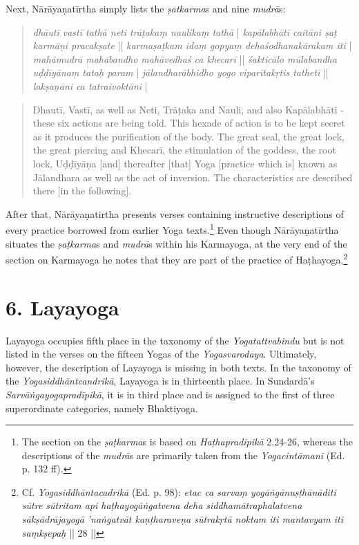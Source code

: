 Next, Nārāyaṇatīrtha simply lists the \textit{ṣatkarma}s and nine \textit{mudrā}s: 
\begin{quote}
\textit{dhāutī vastī tathā neti trāṭakaṃ naulikaṃ tathā} |
\textit{kapālabhātī caitāni ṣaṭ karmāṇi pracakṣate} ||
\textit{karmaṣaṭkam idaṃ gopyaṃ dehaśodhanakārakam iti} |
\textit{mahāmudrā mahābandho mahāvedhaś ca khecarī} ||
\textit{śakticālo mūlabandha uḍḍīyānaṃ tataḥ param} |
\textit{jālandharābhidho yogo viparītakṛtis tatheti} ||
\textit{lakṣaṇāni ca tatraivoktāni} |
\end{quote}
\begin{quote}
  Dhautī, Vastī, as well as Neti, Trāṭaka and Nauli,
  and also Kapālabhāti - these six actions are being told.
  This hexade of action is to be kept secret as it produces the purification of the body.
  The great seal, the great lock, the great piercing and Khecarī,
  the stimulation of the goddess, the root lock, Uḍḍīyāṇa [and] thereafter
  [that] Yoga [practice which is] known as Jālandhara as well as the act of inversion.
  The characteristics are described there [in the following]. 
  \end{quote}

After that, Nārāyaṇatirtha presents verses containing instructive descriptions of every practice borrowed from earlier Yoga texts.\footnote{The section on the \textit{ṣaṭkarma}s is based on \textit{Haṭhapradipikā} 2.24-26, whereas the descriptions of the \textit{mudrā}s are primarily taken from the \textit{Yogacintāmanī} (Ed. p. 132 ff).} Even though Nārāyaṇatīrtha situates the \textit{ṣaṭkarma}s and \textit{mudrā}s within his Karmayoga, at the very end of the section on Karmayoga he notes that they are part of the practice of Haṭhayoga.\footnote{Cf. \textit{Yogasiddhāntacadrikā} (Ed. p. 98): \textit{etac ca sarvaṃ yogāṅgānuṣṭhānāditi sūtre sūtritam api haṭhayogāṅgatvena deha siddhamātraphalatvena sākṣādrājayogā 'naṅgatvāt kaṇṭharaveṇa sūtrakṛtā noktam iti mantavyam iti saṃkṣepaḥ} || 28 ||}

\section{6. Layayoga}
\label{layayogaintro}

Layayoga occupies fifth place in the taxonomy of the \textit{Yogatattvabindu} but is not listed in the verses on the fifteen Yogas of the \textit{Yogasvarodaya}. Ultimately, however, the description of Layayoga is missing in both texts. In the taxonomy of the \textit{Yogasiddhāntcandrikā}, Layayoga is in thirteenth place. In Sundardā's \textit{Sarvāṅgayogapradīpikā}, it is in third place and is assigned to the first of three superordinate categories, namely Bhaktiyoga.

